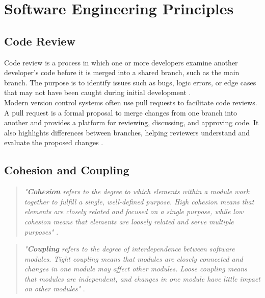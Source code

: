 \newpage

\section{Software Engineering Principles}
\label{sec:software-engineering-principles}

\subsection{Code Review}
\label{subsec:code-review}

Code review is a process in which one or more developers examine another developer’s code before it is merged into a shared branch, such as the main branch. The purpose is to identify issues such as bugs, logic errors, or edge cases that may not have been caught during initial development \cite{gitlab:code-review}. \\

Modern version control systems often use pull requests to facilitate code reviews. A pull request is a formal proposal to merge changes from one branch into another and provides a platform for reviewing, discussing, and approving code. It also highlights differences between branches, helping reviewers understand and evaluate the proposed changes \cite{github:pr}.

\subsection{Cohesion and Coupling}
\label{subsec:cohesion-and-coupling}

\begin{quote}
\textit{"\textbf{Cohesion} refers to the degree to which elements within a module work together to fulfill a single, well-defined purpose. High cohesion means that elements are closely related and focused on a single purpose, while low cohesion means that elements are loosely related and serve multiple purposes"} \cite{geeksforgeeks:c&c}. \\
\end{quote}

\begin{quote}
\textit{"\textbf{Coupling} refers to the degree of interdependence between software modules. Tight coupling means that modules are closely connected and changes in one module may affect other modules. Loose coupling means that modules are independent, and changes in one module have little impact on other modules"} \cite{geeksforgeeks:c&c}. \\
\end{quote}

